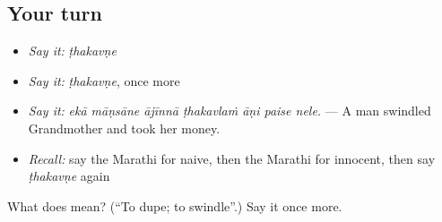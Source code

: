 \subsection*{Your turn}
\begin{itemize}
\raggedright
  \item \emph{Say it:} \emph{ṭhakavṇe}
  \item \emph{Say it:} \emph{ṭhakavṇe}, once more
  \item \emph{Say it:} \emph{ekā māṇsāne ājīnnā ṭhakavlaṁ āṇi paise nele.} — A man swindled Grandmother and took her money.
  \item \emph{Recall:} say the Marathi for naive, then the Marathi for innocent, then say \emph{ṭhakavṇe} again
\end{itemize}

\begin{tcolorbox}[breakable,colback=teal!4,colframe=teal!35!black,title={Before you move on}]
What does  mean? (\textquotedblleft{}To dupe; to swindle\textquotedblright{}.) Say it once more.
\end{tcolorbox}
